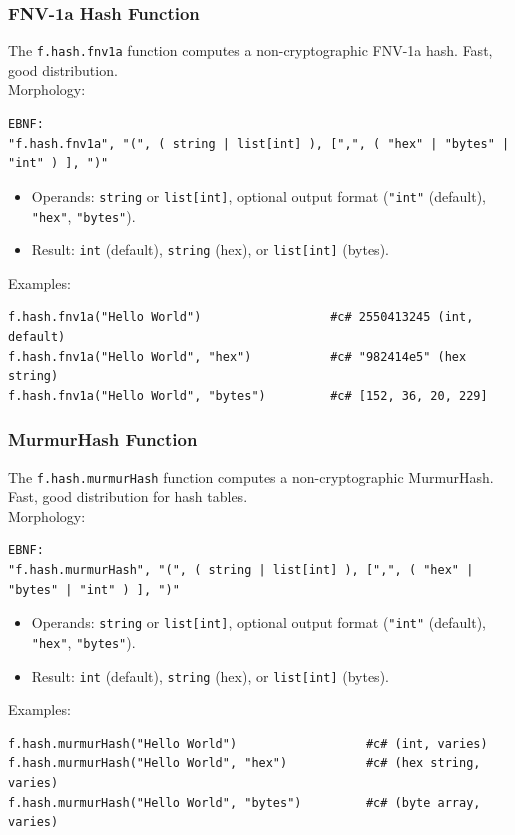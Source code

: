 \subsubsection{FNV-1a Hash Function}
The \texttt{f.hash.fnv1a} function computes a non-cryptographic FNV-1a hash. Fast, good distribution. \\
Morphology:
\begin{verbatim}
EBNF:
"f.hash.fnv1a", "(", ( string | list[int] ), [",", ( "hex" | "bytes" | "int" ) ], ")"
\end{verbatim}
\begin{itemize}
\item Operands: \texttt{string} or \texttt{list[int]}, optional output format (\texttt{"int"} (default), \texttt{"hex"}, \texttt{"bytes"}).
\item Result: \texttt{int} (default), \texttt{string} (hex), or \texttt{list[int]} (bytes).
\end{itemize}
Examples:
\begin{verbatim}
f.hash.fnv1a("Hello World")                  #c# 2550413245 (int, default)
f.hash.fnv1a("Hello World", "hex")           #c# "982414e5" (hex string)
f.hash.fnv1a("Hello World", "bytes")         #c# [152, 36, 20, 229]
\end{verbatim}

\subsubsection{MurmurHash Function}
The \texttt{f.hash.murmurHash} function computes a non-cryptographic MurmurHash. Fast, good distribution for hash tables. \\
Morphology:
\begin{verbatim}
EBNF:
"f.hash.murmurHash", "(", ( string | list[int] ), [",", ( "hex" | "bytes" | "int" ) ], ")"
\end{verbatim}
\begin{itemize}
\item Operands: \texttt{string} or \texttt{list[int]}, optional output format (\texttt{"int"} (default), \texttt{"hex"}, \texttt{"bytes"}).
\item Result: \texttt{int} (default), \texttt{string} (hex), or \texttt{list[int]} (bytes).
\end{itemize}
Examples:
\begin{verbatim}
f.hash.murmurHash("Hello World")                  #c# (int, varies)
f.hash.murmurHash("Hello World", "hex")           #c# (hex string, varies)
f.hash.murmurHash("Hello World", "bytes")         #c# (byte array, varies)
\end{verbatim}

